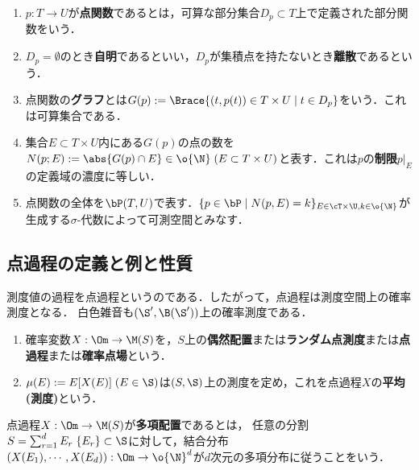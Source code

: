 \documentclass[uplatex,dvipdfmx]{jsreport}
\begin{document}
\begin{definition}\mbox{}
    \begin{enumerate}
        \item $p:T\to U$が\textbf{点関数}であるとは，可算な部分集合$D_p\subset T$上で定義された部分関数をいう．
        \item $D_p=\emptyset$のとき\textbf{自明}であるといい，$D_p$が集積点を持たないとき\textbf{離散}であるという．
        \item 点関数の\textbf{グラフ}とは$G(p):=\Brace{(t,p(t))\in T\times U\mid t\in D_p}$をいう．これは可算集合である．
        \item 集合$E\subset T\times U$内にある$G(p)$の点の数を$N(p;E):=\abs{G(p)\cap E}\in\o{\N}\;(E\subset T\times U)$と表す．これは$p$の\textbf{制限}$p|_E$の定義域の濃度に等しい．
        \item 点関数の全体を$\bP(T,U)$で表す．$\{p\in\bP\mid N(p,E)=k\}_{E\in\cT\times\U,k\in\o{\N}}$が生成する$\sigma$-代数によって可測空間とみなす．
    \end{enumerate}
\end{definition}

\subsection{点過程の定義と例と性質}

\begin{tcolorbox}[colframe=ForestGreen, colback=ForestGreen!10!white,breakable,colbacktitle=ForestGreen!40!white,coltitle=black,fonttitle=\bfseries\sffamily,
title=]
    測度値の過程を点過程というのである．したがって，点過程は測度空間上の確率測度となる．
    白色雑音も$(\S',\B(\S'))$上の確率測度である．
\end{tcolorbox}

\begin{definition}\mbox{}
    \begin{enumerate}
        \item 確率変数$X:\Om\to\M(S)$を，$S$上の\textbf{偶然配置}または\textbf{ランダム点測度}または\textbf{点過程}または\textbf{確率点場}という．
        \item $\mu(E):=E[X(E)]\;(E\in\S)$は$(S,\S)$上の測度を定め，これを点過程$X$の\textbf{平均(測度)}という．
    \end{enumerate}
\end{definition}

\begin{example}[多項偶然測度]
    点過程$X:\Om\to\M(S)$が\textbf{多項配置}であるとは，
    任意の分割$S=\sum_{r=1}^dE_r\;\{E_r\}\subset\S$に対して，結合分布$(X(E_1),\cdots,X(E_d)):\Om\to\o{\N}^d$が$d$次元の多項分布に従うことをいう．
\end{example}
\end{document}
